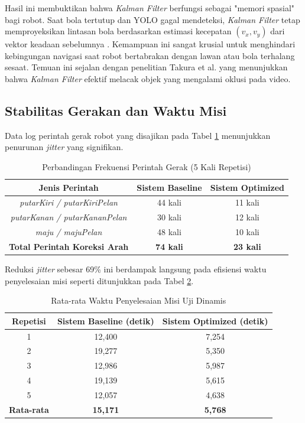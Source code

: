 \documentclass[12pt,a4paper]{article}
\begin{document}
Hasil ini membuktikan bahwa \textit{Kalman Filter} berfungsi sebagai "memori spasial" bagi robot. Saat bola tertutup dan YOLO gagal mendeteksi, \textit{Kalman Filter} tetap memproyeksikan lintasan bola berdasarkan estimasi kecepatan $(v_x, v_y)$ dari vektor keadaan sebelumnya \cite{Saputra2023}. Kemampuan ini sangat krusial untuk menghindari kebingungan navigasi saat robot bertabrakan dengan lawan atau bola terhalang sesaat. Temuan ini sejalan dengan penelitian Takura et al. \cite{Takura2021} yang menunjukkan bahwa \textit{Kalman Filter} efektif melacak objek yang mengalami oklusi pada video.

\subsection{Stabilitas Gerakan dan Waktu Misi}
Data log perintah gerak robot yang disajikan pada Tabel \ref{tab:jitter} menunjukkan penurunan \textit{jitter} yang signifikan.

\begin{table}[H]
\centering
\caption{Perbandingan Frekuensi Perintah Gerak (5 Kali Repetisi)}
\label{tab:jitter}
\begin{tabular}{|c|c|c|}
\hline
\textbf{Jenis Perintah} & \textbf{Sistem Baseline} & \textbf{Sistem Optimized} \\
\hline
\textit{putarKiri / putarKiriPelan} & 44 kali & 11 kali \\
\textit{putarKanan / putarKananPelan} & 30 kali & 12 kali \\
\textit{maju / majuPelan} & 48 kali & 10 kali \\
\hline
\textbf{Total Perintah Koreksi Arah} & \textbf{74 kali} & \textbf{23 kali} \\
\hline
\end{tabular}
\end{table}

Reduksi \textit{jitter} sebesar 69\% ini berdampak langsung pada efisiensi waktu penyelesaian misi seperti ditunjukkan pada Tabel \ref{tab:waktu}.

\begin{table}[H]
\centering
\caption{Rata-rata Waktu Penyelesaian Misi Uji Dinamis}
\label{tab:waktu}
\begin{tabular}{|c|c|c|}
\hline
\textbf{Repetisi} & \textbf{Sistem Baseline (detik)} & \textbf{Sistem Optimized (detik)} \\
\hline
1 & 12,400 & 7,254 \\
2 & 19,277 & 5,350 \\
3 & 12,986 & 5,987 \\
4 & 19,139 & 5,615 \\
5 & 12,057 & 4,638 \\
\hline
\textbf{Rata-rata} & \textbf{15,171} & \textbf{5,768} \\
\hline
\end{tabular}
\end{table}
\end{document}
